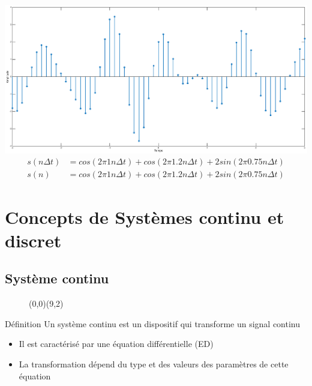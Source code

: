 \documentclass[a4paper,11pt]{beamer}
\begin{document}
\begin{frame}
\centering
\includegraphics[scale=.125]{images/GenSinusDiscret.eps}
$$
\begin{aligned}
s(n\Delta t) &= cos(2\pi1n\Delta t) + cos(2\pi1.2n\Delta t) +
2sin(2\pi0.75n\Delta t)\\
s(n) &= cos(2\pi1n\Delta t) + cos(2\pi1.2n\Delta t) +
2sin(2\pi0.75n\Delta t)
\end{aligned}
$$
\end{frame}


\section{Concepts de Systèmes continu et discret}
\subsection{Système continu} 
\begin{frame}

\begin{figure}
	\begin{pspicture}[showgrid=false](0,0)(9,2)
	\end{pspicture}
\end{figure}
\begin{block}{Définition}
\centering
Un système continu est un dispositif qui transforme un signal continu
\end{block}
\begin{itemize}
\justifying
  \item Il est caractérisé par une équation différentielle (ED)
  \item La transformation dépend du type et des valeurs des paramètres de cette équation
\end{itemize}
\end{frame}
\end{document}
